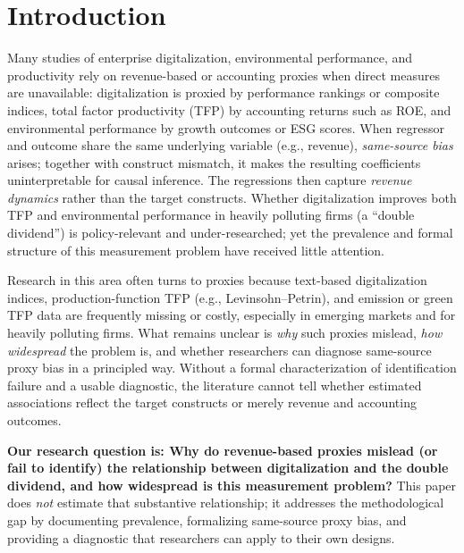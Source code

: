 
\section{Introduction}
\label{sec:introduction}

Many studies of enterprise digitalization, environmental performance, and productivity rely on revenue-based or accounting proxies when direct measures are unavailable: digitalization is proxied by performance rankings or composite indices, total factor productivity (TFP) by accounting returns such as ROE, and environmental performance by growth outcomes or ESG scores. When regressor and outcome share the same underlying variable (e.g., revenue), \emph{same-source bias} arises; together with construct mismatch, it makes the resulting coefficients uninterpretable for causal inference. The regressions then capture \emph{revenue dynamics} rather than the target constructs. Whether digitalization improves both TFP and environmental performance in heavily polluting firms (a ``double dividend'') is policy-relevant and under-researched; yet the prevalence and formal structure of this measurement problem have received little attention.

Research in this area often turns to proxies because text-based digitalization indices, production-function TFP (e.g., Levinsohn--Petrin), and emission or green TFP data are frequently missing or costly, especially in emerging markets and for heavily polluting firms. What remains unclear is \emph{why} such proxies mislead, \emph{how widespread} the problem is, and whether researchers can diagnose same-source proxy bias in a principled way. Without a formal characterization of identification failure and a usable diagnostic, the literature cannot tell whether estimated associations reflect the target constructs or merely revenue and accounting outcomes.

\textbf{Our research question is: Why do revenue-based proxies mislead (or fail to identify) the relationship between digitalization and the double dividend, and how widespread is this measurement problem?} This paper does \emph{not} estimate that substantive relationship; it addresses the methodological gap by documenting prevalence, formalizing same-source proxy bias, and providing a diagnostic that researchers can apply to their own designs.

